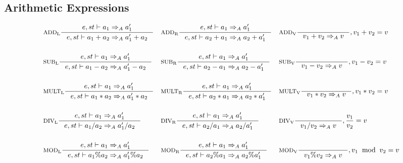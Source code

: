 \subsection{Arithmetic Expressions}
\begin{align*}
&\inference[$\text{ADD}_\text{L}$]{e,st \vdash a_1 \Rightarrow_A a_1'}
                    {e,st \vdash  a_1 + a_2 \Rightarrow_A a_1' + a_2}
&
&\inference[$\text{ADD}_\text{R}$]{e,st \vdash a_1 \Rightarrow_A a_1'}
										{e,st \vdash a_2 + a_1 \Rightarrow_A a_2 + a_1'}
&
&\inference[$\text{ADD}_\text{V}$]{}
                    {v_1 + v_2 \Rightarrow_A v}
										{, v_1 + v_2 = v}
\\\\
&\inference[$\text{SUB}_\text{L}$]{e,st \vdash a_1 \Rightarrow_A a_1'}
                    {e,st \vdash a_1 - a_2 \Rightarrow_A a_1' - a_2}
&
&\inference[$\text{SUB}_\text{R}$]{e,st \vdash a_1 \Rightarrow_A a_1'}
                    {e,st \vdash a_2 - a_1 \Rightarrow_A a_2 - a_1'}
&
&\inference[$\text{SUB}_\text{V}$]{}
                    {v_1 - v_2 \Rightarrow_A v}
										{, v_1 - v_2 = v}
\\\\
&\inference[$\text{MULT}_\text{L}$]{e,st \vdash a_1 \Rightarrow_A a_1'}
                     {e,st \vdash a_1 * a_2 \Rightarrow_A a_1' * a_2}
&
&\inference[$\text{MULT}_\text{R}$]{e,st \vdash a_1 \Rightarrow_A a_1'}
                     {e,st \vdash a_2 * a_1 \Rightarrow_A a_2 * a_1'}
&
&\inference[$\text{MULT}_\text{V}$]{}
                     {v_1 * v_2 \Rightarrow_A v}
										 {, v_1 * v_2 = v}
\\\\
&\inference[$\text{DIV}_\text{L}$]{e,st \vdash a_1 \Rightarrow_A a_1'}
                    {e,st \vdash a_1 / a_2 \Rightarrow_A a_1' / a_2}
&
&\inference[$\text{DIV}_\text{R}$]{e,st \vdash a_1 \Rightarrow_A a_1'}
                    {e,st \vdash a_2 / a_1 \Rightarrow_A a_2 / a_1'}
&
&\inference[$\text{DIV}_\text{V}$]{}
                    {v_1 / v_2 \Rightarrow_A v}
										{, \frac{v_1}{v_2} = v}
\\\\
&\inference[$\text{MOD}_\text{L}$]{e,st \vdash a_1 \Rightarrow_A a_1'}
                    {e,st \vdash a_1 \% a_2 \Rightarrow_A a_1' \% a_2}
&
&\inference[$\text{MOD}_\text{R}$]{e,st \vdash a_1 \Rightarrow_A a_1'}
                    {e,st \vdash a_2 \% a_1 \Rightarrow_A a_2 \% a_1'}
&
&\inference[$\text{MOD}_\text{V}$]{}
                    {v_1 \% v_2 \Rightarrow_A v}
										{, v_1 \;\; \textrm{mod} \;\; v_2 = v}

\end{align*}
